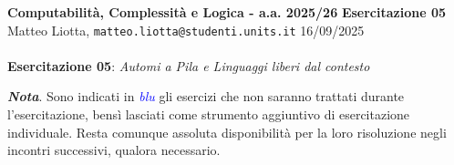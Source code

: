 \documentclass[a4paper,10pt]{article}
\newcommand{\EsercitazioneNum}{05}
\newcommand{\Data}{16/09/2025}
\begin{document}
\footnotesize  %

\noindent
\small \textbf{Computabilità, Complessità e Logica - a.a. 2025/26} \hfill \textbf{Esercitazione \EsercitazioneNum} \\[0.2cm]
\scriptsize Matteo Liotta, \texttt{matteo.liotta@studenti.units.it} \hfill \Data \\[0.2cm]

\noindent\makebox[\linewidth]{\rule{\linewidth}{0.4pt}} \\[1cm]


\noindent\Large \textbf{Esercitazione \EsercitazioneNum}: \textit{Automi a Pila e Linguaggi liberi dal contesto}
\begin{osservazioni}
    \textbf{\textit{Nota}}. Sono indicati in \textcolor{blue}{\textit{blu}} gli esercizi che non saranno trattati durante l'esercitazione, bensì lasciati come strumento aggiuntivo di esercitazione individuale. Resta comunque assoluta disponibilità per la loro risoluzione negli incontri successivi, qualora necessario.
\end{osservazioni}
\end{document}
